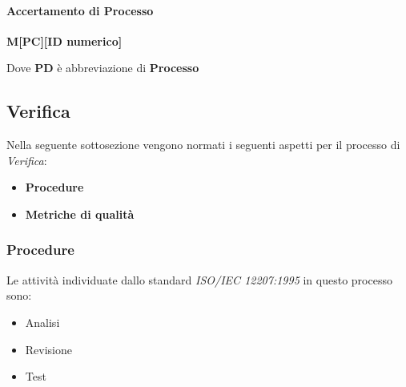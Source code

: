 \paragraph{Accertamento di Processo}
\begin{center}
    \textbf{M[PC][ID numerico]}
\end{center}
Dove \textbf{PD} è abbreviazione di \textbf{Processo}


\subsection{Verifica}
\label{sec:Verifica}
Nella seguente sottosezione vengono normati i seguenti aspetti per il 
processo di \textit{Verifica}:
\begin{itemize}
    \item \textbf{Procedure}
    \item \textbf{Metriche di qualità}
\end{itemize}

\subsubsection{Procedure}
Le attività individuate dallo standard \textit{ISO/IEC 12207:1995} in questo processo sono:
\begin{itemize}
    \item Analisi
    \item Revisione
    \item Test
\end{itemize}

